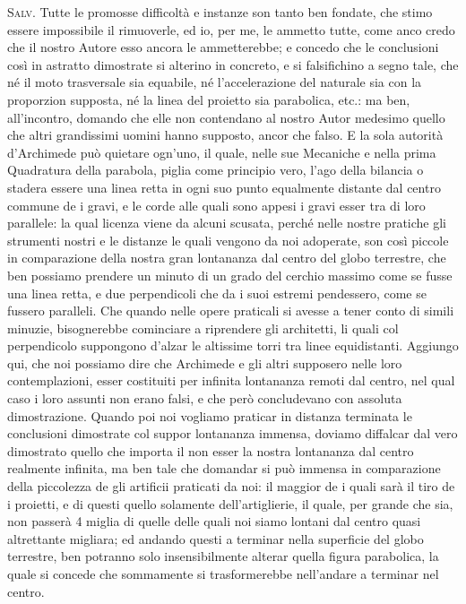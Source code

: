 \documentclass[11pt,twoside,openany]{book}
\newcommand{\speaker}[1]{\textcolor{rubric}{\textsc{#1}}\space}
\begin{document}
\speaker{Salv.} Tutte le promosse difficoltà e instanze son tanto ben fondate, che stimo essere impossibile il rimuoverle, ed io, per me, le ammetto tutte, come anco credo che il nostro Autore esso ancora le ammetterebbe; e concedo che le conclusioni così in astratto dimostrate si alterino in concreto, e si falsifichino a segno tale, che né il moto trasversale sia equabile, né l'accelerazione del naturale sia con la proporzion supposta, né la linea del proietto sia parabolica, etc.: ma ben, all'incontro, domando che elle non contendano al nostro Autor medesimo quello che altri grandissimi uomini hanno supposto, ancor che falso. E la sola autorità d'Archimede può quietare ogn'uno, il quale, nelle sue Mecaniche e nella prima Quadratura della parabola, piglia come principio vero, l'ago della bilancia o stadera essere una linea retta in ogni suo punto equalmente distante dal centro commune de i gravi, e le corde alle quali sono appesi i gravi esser tra di loro parallele: la qual licenza viene da alcuni scusata, perché nelle nostre pratiche gli strumenti nostri e le distanze le quali vengono da noi adoperate, son così piccole in comparazione della nostra gran lontananza dal centro del globo terrestre, che ben possiamo prendere un minuto di un grado del cerchio massimo come se fusse una linea retta, e due perpendicoli che da i suoi estremi pendessero, come se fussero paralleli. Che quando nelle opere praticali si avesse a tener conto di simili minuzie, bisognerebbe cominciare a riprendere gli architetti, li quali col perpendicolo suppongono d'alzar le altissime torri tra linee equidistanti. Aggiungo qui, che noi possiamo dire che Archimede e gli altri supposero nelle loro contemplazioni, esser costituiti per infinita lontananza remoti dal centro, nel qual caso i loro assunti non erano falsi, e che però concludevano con assoluta dimostrazione. Quando poi noi vogliamo praticar in distanza terminata le conclusioni dimostrate col suppor lontananza immensa, doviamo diffalcar dal vero dimostrato quello che importa il non esser la nostra lontananza dal centro realmente infinita, ma ben tale che domandar si può immensa in comparazione della piccolezza de gli artificii praticati da noi: il maggior de i quali sarà il tiro de i proietti, e di questi quello solamente dell'artiglierie, il quale, per grande che sia, non passerà 4 miglia di quelle delle quali noi siamo lontani dal centro quasi altrettante migliara; ed andando questi a terminar nella superficie del globo terrestre, ben potranno solo insensibilmente alterar quella figura parabolica, la quale si concede che sommamente si trasformerebbe nell'andare a terminar nel centro.
\end{document}
